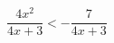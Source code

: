 \begin{ex}[type=inequality]
	\begin{condition}
		\( \dfrac{4x^2}{4x+3} < -\dfrac{7}{4x+3} \)
	\end{condition}
\end{ex}